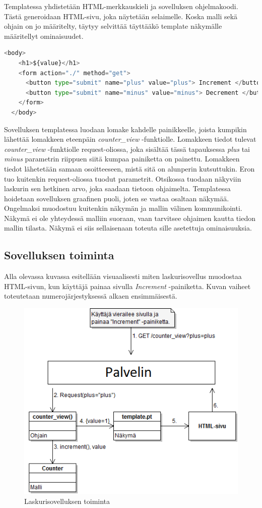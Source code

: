 \documentclass[finnish,utf8,nonumbib,palatino,kandi]{gradu2}
\begin{document}
Templatessa yhdistetään HTML-merkkauskieli ja sovelluksen ohjelmakoodi. Tästä generoidaan HTML-sivu, joka näytetään selaimelle. Koska malli sekä ohjain on jo määritelty, täytyy selvittää täyttääkö template näkymälle määritellyt ominaisuudet.
\begin{lstlisting}[language=Python]
  <body>
    <h1>${value}</h1>
    <form action="./" method="get">
      <button type="submit" name="plus" value="plus"> Increment </button>
      <button type="submit" name="minus" value="minus"> Decrement </button>
    </form>
  </body>
\end{lstlisting}
Sovelluksen templatessa luodaan lomake kahdelle painikkeelle, joista kumpikin lähettää lomakkeen eteenpäin \emph{counter\_view} -funktiolle. Lomakkeen tiedot tulevat \emph{counter\_view} -funktiolle request-oliossa, joka sisältää tässä tapauksessa \emph{plus} tai \emph{minus} parametrin riippuen siitä kumpaa painiketta on painettu. Lomakkeen tiedot lähetetään samaan osoitteeseen, mistä sitä on alunperin kutsuttukin. Eron tuo kuitenkin request-oliossa tuodut parametrit.  Otsikossa tuodaan näkyviin laskurin sen hetkinen arvo, joka saadaan tietoon ohjaimelta.
 Templatessa hoidetaan sovelluksen graafinen puoli, joten se vastaa osaltaan näkymää. \\ Ongelmaksi muodostuu kuitenkin näkymän ja mallin välinen kommunikointi. Näkymä ei ole yhteydessä malliin suoraan, vaan tarvitsee ohjaimen kautta tiedon mallin tilasta.  Näkymä ei siis sellaisenaan toteuta sille asetettuja ominaisuuksia. \\

\subsection{Sovelluksen toiminta}
Alla olevassa kuvassa esitellään visuaalisesti miten laskurisovellus muodostaa HTML-sivun, kun käyttäjä painaa sivulla \emph{Increment} -painiketta. Kuvan
vaiheet toteutetaan numerojärjestyksessä alkaen ensimmäisestä.
\begin{figure}[h]
\centering
\includegraphics[scale=0.87]{laskurisovellus.png}
\caption{Laskurisovelluksen toiminta}
\end{figure}
\newpage
{}
\end{document}
